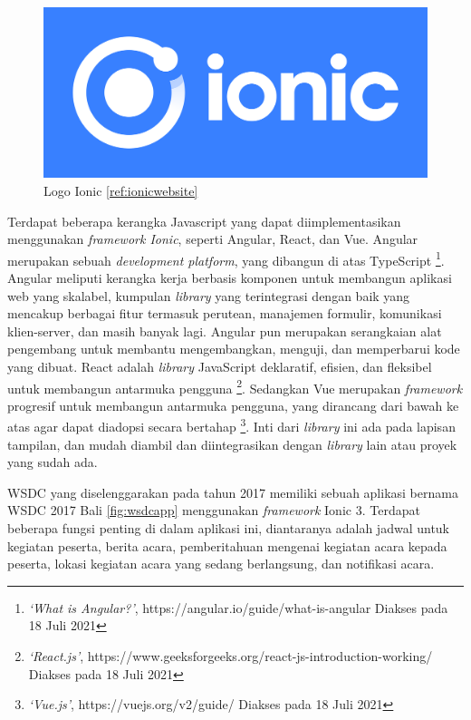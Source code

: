 \begin{figure}[H]
    \centering
    \includegraphics[scale=0.12]{Gambar/ionicLogo.png}
    \caption{Logo Ionic \ref{ref:ionicwebsite}}
    \label{fig:ionic-logo}
\end{figure}

\newpage

Terdapat beberapa kerangka Javascript yang dapat diimplementasikan menggunakan \textit{framework Ionic}, seperti Angular, React, dan Vue. Angular merupakan sebuah \textit{development platform}, yang dibangun di atas TypeScript \footnote{\textit{`What is Angular?'}, https://angular.io/guide/what-is-angular Diakses pada 18 Juli 2021}. Angular meliputi kerangka kerja berbasis komponen untuk membangun aplikasi web yang skalabel, kumpulan \textit{library} yang terintegrasi dengan baik yang mencakup berbagai fitur termasuk perutean, manajemen formulir, komunikasi klien-server, dan masih banyak lagi. Angular pun merupakan serangkaian alat pengembang untuk membantu mengembangkan, menguji, dan memperbarui kode yang dibuat. React adalah \textit{library}  JavaScript deklaratif, efisien, dan fleksibel untuk membangun antarmuka pengguna \footnote{\textit{`React.js'}, https://www.geeksforgeeks.org/react-js-introduction-working/ Diakses pada 18 Juli 2021}. Sedangkan Vue merupakan \textit{framework}  progresif untuk membangun antarmuka pengguna, yang dirancang dari bawah ke atas agar dapat diadopsi secara bertahap \footnote{\textit{`Vue.js'}, https://vuejs.org/v2/guide/ Diakses pada 18 Juli 2021}. Inti dari \textit{library} ini ada pada lapisan tampilan, dan mudah diambil dan diintegrasikan dengan \textit{library} lain atau proyek yang sudah ada. 

WSDC yang diselenggarakan pada tahun 2017 memiliki sebuah aplikasi bernama WSDC 2017 Bali \ref{fig:wsdcapp}  menggunakan \textit{framework} Ionic 3. Terdapat beberapa fungsi penting di dalam aplikasi ini, diantaranya adalah jadwal untuk kegiatan peserta, berita acara, pemberitahuan mengenai kegiatan acara kepada peserta, lokasi kegiatan acara yang sedang berlangsung, dan notifikasi acara. 

